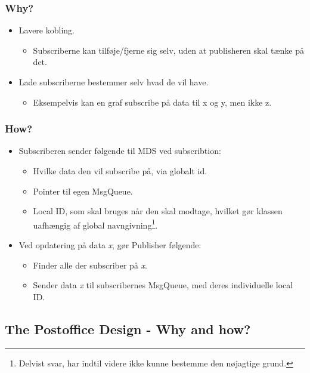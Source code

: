 \subsubsection{Why?}
\begin{itemize}
	\item Lavere kobling.
	\begin{itemize}
		\item Subscriberne kan tilføje/fjerne sig selv, uden at publisheren skal tænke på det.
	\end{itemize}
	\item Lade subscriberne bestemmer selv hvad de vil have.
	\begin{itemize}
		\item Eksempelvis kan en graf subscribe på data til x og y, men ikke z.
	\end{itemize}
\end{itemize}

\subsubsection{How?}
\begin{itemize}
	\item Subscriberen sender følgende til MDS ved subscribtion:
	\begin{itemize}
		\item Hvilke data den vil subscribe på, via globalt id.
		\item Pointer til egen MsgQueue.
		\item {}Local ID, som skal bruges når den skal modtage, hvilket gør klassen uafhængig af global navngivning\footnote{Delvist svar, har indtil videre ikke kunne bestemme den nøjagtige grund.}.
	\end{itemize}
	\item Ved opdatering på data \textit{x}, gør Publisher følgende:
	\begin{itemize}
		\item Finder alle der subscriber på \textit{x}.
		\item Sender data \textit{x} til subscribernes MsgQueue, med deres individuelle local ID.
	\end{itemize}
\end{itemize}


\subsection{The Postoffice Design - Why and how?}

